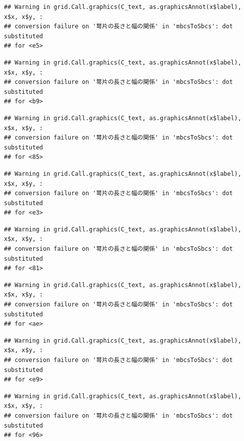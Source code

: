 \documentclass[
]{book}
\begin{document}
\begin{verbatim}
## Warning in grid.Call.graphics(C_text, as.graphicsAnnot(x$label), x$x, x$y, :
## conversion failure on '萼片の長さと幅の関係' in 'mbcsToSbcs': dot substituted
## for <e5>
\end{verbatim}

\begin{verbatim}
## Warning in grid.Call.graphics(C_text, as.graphicsAnnot(x$label), x$x, x$y, :
## conversion failure on '萼片の長さと幅の関係' in 'mbcsToSbcs': dot substituted
## for <b9>
\end{verbatim}

\begin{verbatim}
## Warning in grid.Call.graphics(C_text, as.graphicsAnnot(x$label), x$x, x$y, :
## conversion failure on '萼片の長さと幅の関係' in 'mbcsToSbcs': dot substituted
## for <85>
\end{verbatim}

\begin{verbatim}
## Warning in grid.Call.graphics(C_text, as.graphicsAnnot(x$label), x$x, x$y, :
## conversion failure on '萼片の長さと幅の関係' in 'mbcsToSbcs': dot substituted
## for <e3>
\end{verbatim}

\begin{verbatim}
## Warning in grid.Call.graphics(C_text, as.graphicsAnnot(x$label), x$x, x$y, :
## conversion failure on '萼片の長さと幅の関係' in 'mbcsToSbcs': dot substituted
## for <81>
\end{verbatim}

\begin{verbatim}
## Warning in grid.Call.graphics(C_text, as.graphicsAnnot(x$label), x$x, x$y, :
## conversion failure on '萼片の長さと幅の関係' in 'mbcsToSbcs': dot substituted
## for <ae>
\end{verbatim}

\begin{verbatim}
## Warning in grid.Call.graphics(C_text, as.graphicsAnnot(x$label), x$x, x$y, :
## conversion failure on '萼片の長さと幅の関係' in 'mbcsToSbcs': dot substituted
## for <e9>
\end{verbatim}

\begin{verbatim}
## Warning in grid.Call.graphics(C_text, as.graphicsAnnot(x$label), x$x, x$y, :
## conversion failure on '萼片の長さと幅の関係' in 'mbcsToSbcs': dot substituted
## for <96>
\end{verbatim}
\end{document}
